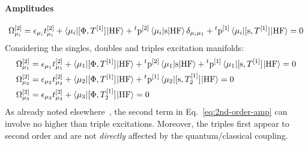 \paragraph*{Amplitudes}
\begin{equation}\label{eq:2nd-order-amp}
  \Omega_{\mu_i}^{[2]} = \epsilon_{\mu_i}t_{\mu_i}^{[2]}
  + \braket{\mu_i | [ \Phi, T^{[1]} ]^{} | \mathrm{HF}}
  + {}^t\mathrm{p}^{[2]}\braket{\mu_i | \mathrm{s} | \mathrm{HF}}\delta_{\mu_i\mu_1}
  + {}^t\mathrm{p}^{[1]}\braket{\mu_i | [ \mathrm{s}, T^{[1]} ]^{} |
  \mathrm{HF}}
  = 0
\end{equation}
Considering the singles, doubles and triples excitation manifolds:
\begin{subequations}
  \begin{align}
  \Omega_{\mu_1}^{[2]} &= \epsilon_{\mu_1}t_{\mu_1}^{[2]}
  + \braket{\mu_1 | [ \Phi, T^{[1]} ]^{} | \mathrm{HF}}
  + {}^t\mathrm{p}^{[2]}\braket{\mu_1 | \mathrm{s} | \mathrm{HF}}
  + {}^t\mathrm{p}^{[1]}\braket{\mu_1 | [ \mathrm{s}, T^{[1]} ]^{} |
  \mathrm{HF}}
  = 0 \\
  \Omega_{\mu_2}^{[2]} &= \epsilon_{\mu_2}t_{\mu_2}^{[2]}
  + \braket{\mu_2 | [ \Phi, T^{[1]} ]^{} | \mathrm{HF}}
  + {}^t\mathrm{p}^{[1]}\braket{\mu_2 | [ \mathrm{s}, T_2^{[1]} ]^{} |
  \mathrm{HF}}
  = 0 \\
  \Omega_{\mu_3}^{[2]} &= \epsilon_{\mu_3}t_{\mu_3}^{[2]}
  + \braket{\mu_3 | [ \Phi, T_2^{[1]} ]^{} | \mathrm{HF}}
  = 0
  \end{align}
\end{subequations}
As already noted elsewhere~\autocite{Koch1997-nm, Helgaker2000-tz},
the second term in Eq.~\eqref{eq:2nd-order-amp} can involve no higher
than triple excitations.
Moreover, the triples first appear to second order and are not \emph{directly}
affected by the quantum/classical coupling.

